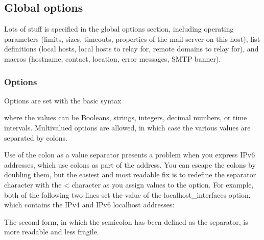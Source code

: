 \protect\hypertarget{part0026_split_046.html}{}{}

\hypertarget{part0026_split_046.htmlux5cux23_idContainer1247}{}
\hypertarget{part0026_split_046.htmlux5cux23calibre_pb_45}{%
\subsection[Global
options]{\texorpdfstring{\protect\hypertarget{part0026_split_046.htmlux5cux23_idTextAnchor1136}{}{}Global
options}{Global options}}\label{part0026_split_046.htmlux5cux23calibre_pb_45}}

\protect\hypertarget{part0026_split_046.htmlux5cux23_idIndexMarker2642}{}{}Lots
of stuff is specified in the global options section, including operating
parameters (limits, sizes, timeouts, properties of the mail server on
this host), list definitions (local hosts, local hosts to relay for,
remote domains to relay for), and macros (hostname, contact, location,
error messages, SMTP banner).

\subsubsection[Options]{\texorpdfstring{\protect\hypertarget{part0026_split_046.htmlux5cux23_idTextAnchor1137}{}{}Options}{Options}}

\protect\hypertarget{part0026_split_046.htmlux5cux23_idIndexMarker2643}{}{}Options
are set with the basic syntax


where the {values} can be Booleans, strings, integers, decimal numbers,
or time intervals. Multivalued options are allowed, in which case the
various values are separated by colons.

Use of the colon as a value separator presents a problem when you
express IPv6 addresses, which use colons as part of the address. You can
escape the colons by doubling them, but the easiest and most readable
fix is to redefine the separator character with the {\textless{}}
character as you assign values to the option. For example, both of the
following two lines set the value of the {localhost\_interfaces} option,
which contains the IPv4 and IPv6 localhost
addresses:\protect\hypertarget{part0026_split_046.htmlux5cux23_idIndexMarker2644}{}{}


The second form, in which the semicolon has been defined as the
separator, is more readable and less fragile.

